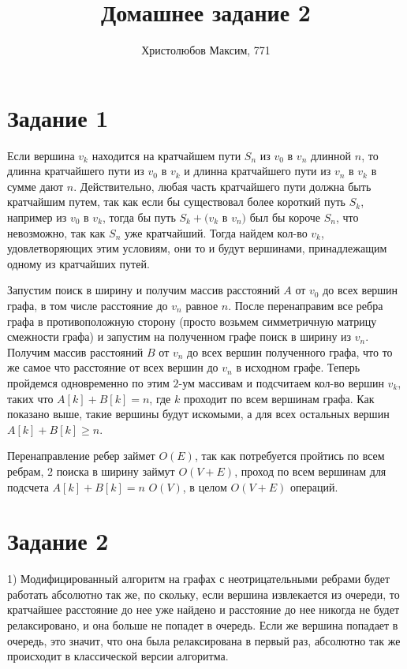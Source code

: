 \documentclass[a4paper,12pt]{article}
\author{Христолюбов Максим, 771}
\title{Домашнее задание 2}
\date{ }
\begin{document}

\maketitle

\section*{Задание 1}
\hspace{0.5cm}
Если вершина $v_{k}$ находится на кратчайшем пути $S_{n}$ из $v_{0}$ в $v_{n}$ длинной $n$, то длинна кратчайшего пути из $v_{0}$ в $v_{k}$ и длинна кратчайшего пути из $v_{n}$ в $v_{k}$ в сумме дают $n$. Действительно, любая часть кратчайшего пути должна быть кратчайшим путем, так как если бы существовал более короткий путь $S_{k}$, например из $v_{0}$ в $v_{k}$, тогда бы путь $S_{k}+(v_{k}$ в $v_{n})$ был бы короче $S_{n}$, что невозможно, так как $S_{n}$ уже кратчайший. Тогда найдем кол-во $v_{k}$, удовлетворяющих этим условиям, они то и будут вершинами, принадлежащим одному из кратчайших путей.

Запустим поиск в ширину и получим массив расстояний $A$ от $v_{0}$ до всех вершин графа, в том числе расстояние до $v_{n}$ равное $n$. После перенаправим все ребра графа в противоположную сторону (просто возьмем симметричную матрицу смежности графа) и запустим на полученном графе поиск в ширину из $v_{n}$. Получим массив расстояний $B$ от $v_{n}$ до всех вершин полученного графа, что то же самое что расстояние от всех вершин до $v_{n}$ в исходном графе. Теперь пройдемся одновременно по этим $2$-ум массивам и подсчитаем кол-во вершин $v_{k}$, таких что $A[k]+B[k]=n$, где $k$ проходит по всем вершинам графа. Как показано выше, такие вершины будут искомыми, а для всех остальных вершин $A[k]+B[k]\geq n$.

Перенаправление ребер займет $O(E)$, так как потребуется пройтись по всем ребрам, $2$ поиска в ширину займут $O(V+E)$, проход по всем вершинам для подсчета $A[k]+B[k]=n$ $O(V)$, в целом $O(V+E)$ операций.

\section*{Задание 2}
\hspace{0.5cm}
1) Модифицированный алгоритм на графах с неотрицательными ребрами будет работать абсолютно так же, по скольку, если вершина извлекается из очереди, то кратчайшее расстояние до нее уже найдено и расстояние до нее никогда не будет релаксировано, и она больше не попадет в очередь. Если же вершина попадает в очередь, это значит, что она была релаксирована в первый раз, абсолютно так же происходит в классической версии алгоритма.
\end{document}
